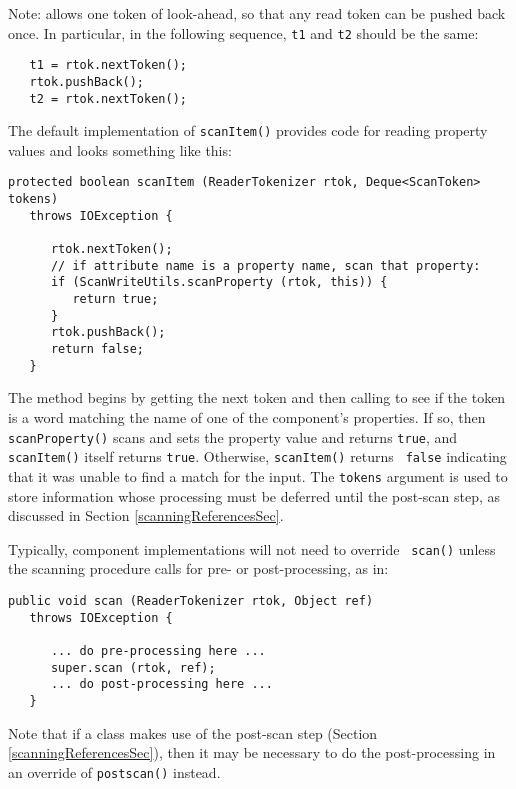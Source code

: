 \documentclass{article}
\begin{document}
\begin{sideblock}
Note:  allows one
token of look-ahead, so that any read token can be pushed
back once. In particular, in the following sequence,
{\tt t1} and {\tt t2} should be the same:
\begin{verbatim}
   t1 = rtok.nextToken();
   rtok.pushBack();
   t2 = rtok.nextToken();
\end{verbatim}
\end{sideblock}

The default implementation of {\tt scanItem()} provides
code for reading property values and looks something like this:
\begin{lstlisting}[]
   protected boolean scanItem (ReaderTokenizer rtok, Deque<ScanToken> tokens)
   throws IOException {

      rtok.nextToken();
      // if attribute name is a property name, scan that property:
      if (ScanWriteUtils.scanProperty (rtok, this)) {
         return true;
      }
      rtok.pushBack();
      return false;
   }
\end{lstlisting}
The method begins by getting the next token and then calling
to see if the token is a word matching the name of one of the
component's properties. If so, then {\tt scanProperty()} scans and
sets the property value and returns {\tt true}, and {\tt scanItem()}
itself returns {\tt true}. Otherwise, {\tt scanItem()} returns {\tt
false} indicating that it was unable to find a match for the input.
The {\tt tokens} argument is used to store information whose
processing must be deferred until the post-scan step, as discussed in
Section \ref{scanningReferencesSec}.

Typically, component implementations will not need to override {\tt
scan()} unless the scanning procedure calls for pre- or
post-processing, as in:
\begin{lstlisting}[]
   public void scan (ReaderTokenizer rtok, Object ref) 
   throws IOException {

      ... do pre-processing here ...
      super.scan (rtok, ref);
      ... do post-processing here ...
   }   
\end{lstlisting}
Note that if a class makes use of the post-scan step (Section
\ref{scanningReferencesSec}), then it may be necessary to do the
post-processing in an override of {\tt postscan()} instead.
\end{document}
